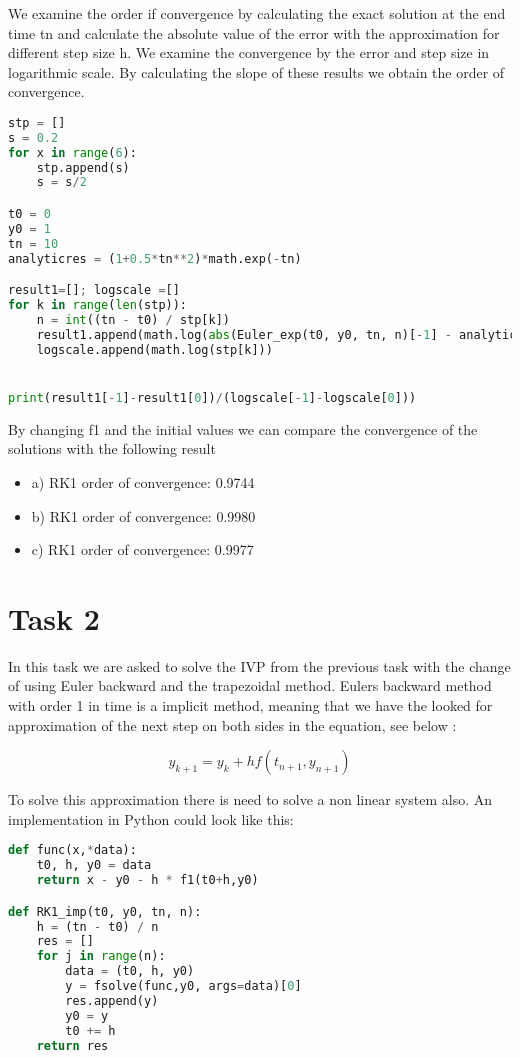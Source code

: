 \documentclass[a4paper]{article}
\begin{document}
We examine the order if convergence by calculating the exact solution at the end time tn and calculate the absolute value of the error with the approximation for different step size h. We examine the convergence by the error and step size in logarithmic scale. By calculating the slope of these results we obtain the order of convergence. 

\begin{lstlisting}[language=Python]
stp = []
s = 0.2
for x in range(6):
    stp.append(s)
    s = s/2

t0 = 0
y0 = 1
tn = 10
analyticres = (1+0.5*tn**2)*math.exp(-tn)

result1=[]; logscale =[]
for k in range(len(stp)):
    n = int((tn - t0) / stp[k])
    result1.append(math.log(abs(Euler_exp(t0, y0, tn, n)[-1] - analyticres)))
    logscale.append(math.log(stp[k]))


print(result1[-1]-result1[0])/(logscale[-1]-logscale[0]))
\end{lstlisting}  


By changing f1 and the initial values we can compare the convergence of the solutions with the following result

\begin{itemize}
	\item a) RK1 order of convergence:  0.9744
	\item b) RK1 order of convergence:  0.9980
	\item c) RK1 order of convergence:  0.9977
\end{itemize}


\section*{Task 2}
In this task we are asked to solve the IVP from the previous task with the change of using Euler backward and the trapezoidal method. Eulers backward method with order 1 in time is a implicit method, meaning that we have the looked for approximation of the next step on both sides in the equation, see below \citep{trap}:

\begin{equation}
 y_{k+1} = y_k + h f(t_{n+1},y_{n+1})
 \end{equation} 

To solve this approximation there is need to solve a non linear system also. An implementation in Python could look like this: 

\begin{lstlisting}[language=Python]
def func(x,*data):
    t0, h, y0 = data
    return x - y0 - h * f1(t0+h,y0)

def RK1_imp(t0, y0, tn, n):
    h = (tn - t0) / n
    res = []
    for j in range(n):
        data = (t0, h, y0)
        y = fsolve(func,y0, args=data)[0]
        res.append(y)
        y0 = y
        t0 += h
    return res
\end{lstlisting}
\end{document}

